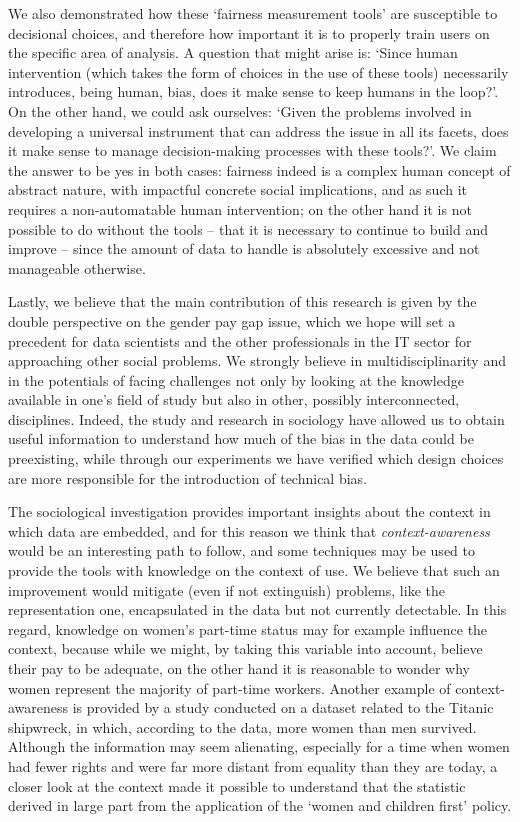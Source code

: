 We also demonstrated how these `fairness measurement tools' are susceptible to decisional choices, and therefore how important it is to properly train users on the specific area of analysis. A question that might arise is: `Since human intervention (which takes the form of choices in the use of these tools) necessarily introduces, being human, bias, does it make sense to keep humans in the loop?'. On the other hand, we could ask ourselves: `Given the problems involved in developing a universal instrument that can address the issue in all its facets, does it make sense to manage decision-making processes with these tools?'. We claim the answer to be yes in both cases: fairness indeed is a complex human concept of abstract nature, with impactful concrete social implications, and as such it requires a non-automatable human intervention; on the other hand it is not possible to do without the tools -- that it is necessary to continue to build and improve -- since the amount of data to handle is absolutely excessive and not manageable otherwise.

Lastly, we believe that the main contribution of this research is given by the double perspective on the gender pay gap issue, which we hope will set a precedent for data scientists and the other professionals in the IT sector for approaching other social problems. We strongly believe in multidisciplinarity and in the potentials of facing challenges not only by looking at the knowledge available in one's field of study but also in other, possibly interconnected, disciplines. Indeed, the study and research in sociology have allowed us to obtain useful information to understand how much of the bias in the data could be preexisting, while through our experiments we have verified which design choices are more responsible for the introduction of technical bias.

The sociological investigation provides important insights about the context in which data are embedded, and for this reason we think that \textit{context-awareness} would be an interesting path to follow, and some techniques may be used to provide the tools with knowledge on the context of use. We believe that such an improvement would mitigate (even if not extinguish) problems, like the representation one, encapsulated in the data but not currently detectable. In this regard, knowledge on women's part-time status may for example influence the context, because while we might, by taking this variable into account, believe their pay to be adequate, on the other hand it is reasonable to wonder why women represent the majority of part-time workers. Another example of context-awareness is provided by a study conducted on a dataset related to the Titanic shipwreck, in which, according to the data, more women than men survived. Although the information may seem alienating, especially for a time when women had fewer rights and were far more distant from equality than they are today, a closer look at the context made it possible to understand that the statistic derived in large part from the application of the `women and children first' policy.

